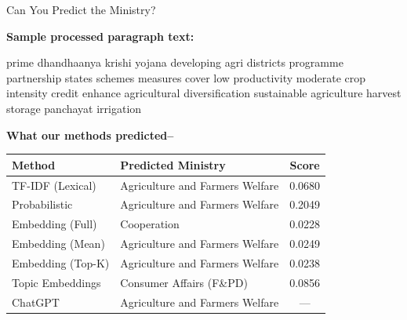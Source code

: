 \documentclass{beamer}
\begin{document}
\begin{frame}{Can You Predict the Ministry?}

\textbf{Sample processed paragraph text:}
\vspace{-0.9em}
\small
\begin{block}{}
prime dhandhaanya krishi yojana developing agri districts programme partnership states schemes measures cover low productivity moderate crop intensity  credit enhance agricultural diversification sustainable agriculture harvest storage panchayat irrigation
\end{block}

\textbf{What our methods predicted--}

\begin{table}[]
\centering
\small
\begin{tabular}{@{} l l c @{}}
\toprule
\textbf{Method} & \textbf{Predicted Ministry} & \textbf{Score} \\
\midrule
TF-IDF (Lexical) & Agriculture and Farmers Welfare & 0.0680 \\
Probabilistic & Agriculture and Farmers Welfare & 0.2049 \\
Embedding (Full) & Cooperation & 0.0228 \\
Embedding (Mean) & Agriculture and Farmers Welfare & 0.0249 \\
Embedding (Top-K) & Agriculture and Farmers Welfare & 0.0238 \\
Topic Embeddings & Consumer Affairs (F\&PD) & 0.0856 \\
ChatGPT & Agriculture and Farmers Welfare & --- \\
\bottomrule
\end{tabular}
\end{table}

\end{frame}
\end{document}
